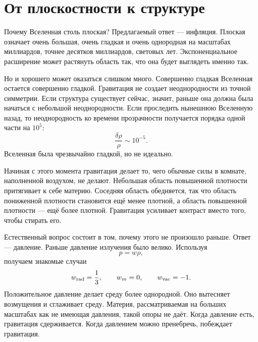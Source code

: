 \begin{classroomqa}
\end{classroomqa}

\begin{classroomqa}
\end{classroomqa}

\section{От плоскостности к структуре}

Почему Вселенная столь плоская? Предлагаемый ответ — инфляция. Плоская означает очень большая, очень гладкая и очень однородная на масштабах миллиардов, точнее десятков миллиардов, световых лет. Экспоненциальное расширение может растянуть область так, что она будет выглядеть именно так.

Но и хорошего может оказаться слишком много. Совершенно гладкая Вселенная остается совершенно гладкой. Гравитация не создает неоднородности из точной симметрии. Если структура существует сейчас, значит, раньше она должна была начаться с небольшой неоднородности. Если проследить нынешнюю Вселенную назад, то неоднородность ко времени прозрачности получается порядка одной части на \(10^5\):
\begin{equation}
\frac{\delta\rho}{\rho}\sim 10^{-5}.
\end{equation}
Вселенная была чрезвычайно гладкой, но не идеально.

Начиная с этого момента гравитация делает то, чего обычные силы в комнате, наполненной воздухом, не делают. Небольшая область повышенной плотности притягивает к себе материю. Соседняя область обедняется, так что область пониженной плотности становится ещё менее плотной, а область повышенной плотности — ещё более плотной. Гравитация усиливает контраст вместо того, чтобы стирать его.

Естественный вопрос состоит в том, почему этого не произошло раньше. Ответ — давление. Раньше давление излучения было велико. Используя
\begin{equation}
p=w\rho,
\end{equation}
получаем знакомые случаи
\begin{equation}
w_{\rm rad}=\frac13,\qquad
w_m=0,\qquad
w_{\rm vac}=-1.
\end{equation}
Положительное давление делает среду более однородной. Оно вытесняет возмущения и сглаживает среду. Материя, рассматриваемая на больших масштабах как не имеющая давления, такой опоры не даёт. Когда давление есть, гравитация сдерживается. Когда давлением можно пренебречь, побеждает гравитация.


